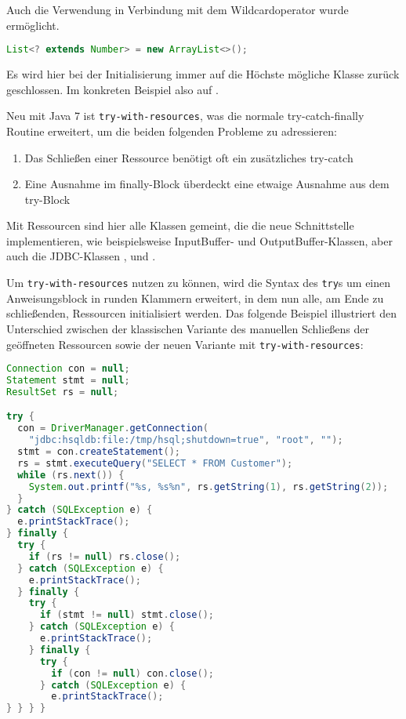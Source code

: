 \documentclass[times, 10pt,twocolumn]{article}
\begin{document}
Auch die Verwendung in Verbindung mit dem Wildcardoperator wurde ermöglicht.
\begin{lstlisting}[language=java,breaklines=true]
  List<? extends Number> = new ArrayList<>();
\end{lstlisting}
Es wird hier bei der Initialisierung immer auf die Höchste mögliche Klasse zurück geschlossen. Im konkreten Beispiel also auf .\cite{v2bJava7}

Neu mit Java 7 ist \texttt{try-with-resources}, was die normale try-catch-finally Routine erweitert,
um die beiden folgenden Probleme zu adressieren:\cite{javainsel2}
\begin{enumerate}
\item Das Schließen einer Ressource benötigt oft ein zusätzliches try-catch
\item Eine Ausnahme im finally-Block überdeckt eine etwaige Ausnahme aus dem try-Block
\end{enumerate}

Mit Ressourcen sind hier alle Klassen gemeint, die die neue Schnittstelle  implementieren, wie beispielsweise
InputBuffer- und OutputBuffer-Klassen, aber auch die JDBC-Klassen ,  und .

Um \texttt{try-with-resources} nutzen zu können, wird die Syntax des \texttt{try}s um einen Anweisungsblock in runden Klammern erweitert,
in dem nun alle, am Ende zu schließenden, Ressourcen initialisiert werden. Das folgende Beispiel illustriert den Unterschied zwischen der
klassischen Variante des manuellen Schließens der geöffneten Ressourcen sowie der neuen Variante mit \texttt{try-with-resources}:

\begin{lstlisting}[language=java,breaklines=true]
Connection con = null;
Statement stmt = null;
ResultSet rs = null;

try {
  con = DriverManager.getConnection(
	"jdbc:hsqldb:file:/tmp/hsql;shutdown=true", "root", "");
  stmt = con.createStatement();
  rs = stmt.executeQuery("SELECT * FROM Customer");
  while (rs.next()) {
	System.out.printf("%s, %s%n", rs.getString(1), rs.getString(2));
  }
} catch (SQLException e) {
  e.printStackTrace();
} finally {
  try {
	if (rs != null) rs.close();
  } catch (SQLException e) {
	e.printStackTrace();
  } finally {
	try {
	  if (stmt != null)	stmt.close();
	} catch (SQLException e) {
	  e.printStackTrace();
	} finally {
	  try {
		if (con != null) con.close();
	  } catch (SQLException e) {
		e.printStackTrace();
} } } }
\end{lstlisting}
\end{document}
